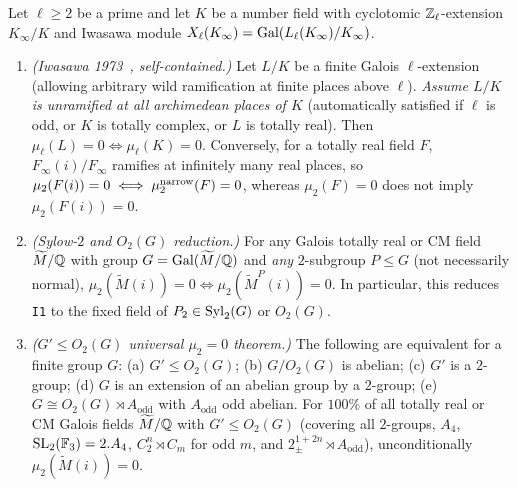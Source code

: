 \begin{theorem}\label{thm:3:group}
\tagProved{}
Let $\ell \ge 2$ be a prime and let $K$ be a number field with cyclotomic $\mathbb{Z}_\ell$-extension $K_\infty/K$ and Iwasawa module $X_\ell(K_\infty) = \mathrm{Gal}(L_\ell(K_\infty)/K_\infty)$.
\begin{enumerate}[label=\textup{(\roman*)}]
\item \emph{(Iwasawa 1973~\cite{Iwasawa1973}, self-contained.)} Let $L/K$ be a finite Galois $\ell$-extension (allowing arbitrary wild ramification at finite places above $\ell$). \emph{Assume $L/K$ is unramified at all archimedean places of $K$} (automatically satisfied if $\ell$ is odd, or $K$ is totally complex, or $L$ is totally real). Then $\mu_\ell(L) = 0 \iff \mu_\ell(K) = 0$. Conversely, for a totally real field $F$, $F_\infty(i)/F_\infty$ ramifies at infinitely many real places, so $\mu_2(F(i)) = 0 \iff \mu_2^{\mathrm{narrow}}(F) = 0$, whereas $\mu_2(F) = 0$ does not imply $\mu_2(F(i)) = 0$.
\item \emph{(Sylow-$2$ and $O_2(G)$ reduction.)} For any Galois totally real or CM field $\widetilde{M}/\mathbb{Q}$ with group $G = \mathrm{Gal}(\widetilde{M}/\mathbb{Q})$ and \emph{any} $2$-subgroup $P \le G$ (not necessarily normal), $\mu_2(\widetilde{M}(i)) = 0 \iff \mu_2(\widetilde{M}^P(i)) = 0$. In particular, this reduces \texttt{I1} to the fixed field of $P_2 \in \mathrm{Syl}_2(G)$ or $O_2(G)$.
\item \emph{($G' \le O_2(G)$ universal $\mu_2 = 0$ theorem.)} The following are equivalent for a finite group $G$: \textup{(a)} $G' \le O_2(G)$; \textup{(b)} $G/O_2(G)$ is abelian; \textup{(c)} $G'$ is a $2$-group; \textup{(d)} $G$ is an extension of an abelian group by a $2$-group; \textup{(e)} $G \cong O_2(G) \rtimes A_{\mathrm{odd}}$ with $A_{\mathrm{odd}}$ odd abelian. For $100\%$ of all totally real or CM Galois fields $\widetilde{M}/\mathbb{Q}$ with $G' \le O_2(G)$ (covering all $2$-groups, $A_4$, $\mathrm{SL}_2(\mathbb{F}_3) = 2.A_4$, $C_2^n \rtimes C_m$ for odd $m$, and $2_\pm^{1+2n} \rtimes A_{\mathrm{odd}}$), unconditionally $\mu_2(\widetilde{M}(i)) = 0$.
\end{enumerate}
\end{theorem}

